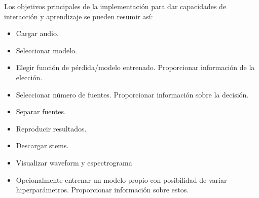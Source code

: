 Los objetivos principales de la implementación para dar capacidades de interacción y aprendizaje se pueden resumir así:

\begin{itemize}
    \item Cargar audio.
    \item Seleccionar modelo.
    \item Elegir función de pérdida/modelo entrenado. Proporcionar información de la elección.
    \item Seleccionar número de fuentes. Proporcionar información sobre la decisión.
    \item Separar fuentes.
    \item Reproducir resultados.
    \item Descargar stems.
    \item Visualizar waveform y espectrograma
    \item Opcionalmente entrenar un modelo propio con posibilidad de variar hiperparámetros. Proporcionar información sobre estos.
\end{itemize}

